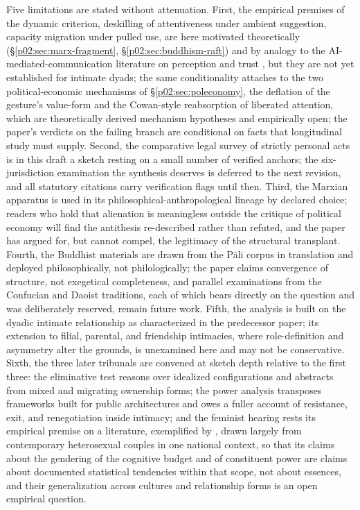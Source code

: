 Five limitations are stated without attenuation. First, the empirical premises of the dynamic criterion, deskilling of attentiveness under ambient suggestion, capacity migration under pulled use, are here motivated theoretically (\S\ref{p02:sec:marx-fragment}, \S\ref{p02:sec:buddhism-raft}) and by analogy to the AI-mediated-communication literature on perception and trust \parencite{hancock2020ai,jakesch2019ai}, but they are not yet established for intimate dyads; the same conditionality attaches to the two political-economic mechanisms of \S\ref{p02:sec:poleconomy}, the deflation of the gesture's value-form and the Cowan-style reabsorption of liberated attention, which are theoretically derived mechanism hypotheses and empirically open; the paper's verdicts on the failing branch are conditional on facts that longitudinal study must supply. Second, the comparative legal survey of strictly personal acts is in this draft a sketch resting on a small number of verified anchors; the six-jurisdiction examination the synthesis deserves is deferred to the next revision, and all statutory citations carry verification flags until then. Third, the Marxian apparatus is used in its philosophical-anthropological lineage by declared choice; readers who hold that alienation is meaningless outside the critique of political economy will find the antithesis re-described rather than refuted, and the paper has argued for, but cannot compel, the legitimacy of the structural transplant. Fourth, the Buddhist materials are drawn from the P\=ali corpus in translation and deployed philosophically, not philologically; the paper claims convergence of structure, not exegetical completeness, and parallel examinations from the Confucian and Daoist traditions, each of which bears directly on the question and was deliberately reserved, remain future work. Fifth, the analysis is built on the dyadic intimate relationship as characterized in the predecessor paper; its extension to filial, parental, and friendship intimacies, where role-definition and asymmetry alter the grounds, is unexamined here and may not be conservative. Sixth, the three later tribunals are convened at sketch depth relative to the first three: the eliminative test reasons over idealized configurations and abstracts from mixed and migrating ownership forms; the power analysis transposes frameworks built for public architectures and owes a fuller account of resistance, exit, and renegotiation inside intimacy; and the feminist hearing rests its empirical premise on a literature, exemplified by \textcite{daminger2019cognitive}, drawn largely from contemporary heterosexual couples in one national context, so that its claims about the gendering of the cognitive budget and of constituent power are claims about documented statistical tendencies within that scope, not about essences, and their generalization across cultures and relationship forms is an open empirical question.

